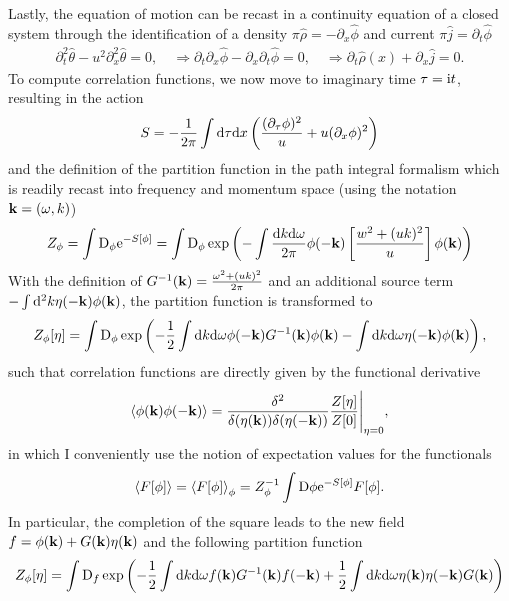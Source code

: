 Lastly, the equation of motion can be recast in a continuity equation of a closed system through the identification of a density $\pi\hat\rho=-\partial_x\hat\phi$ and current $\pi\hat j = \partial_t\hat\phi$
\begin{align}
    \partial_t^2\hat \theta - u^2\partial_x^2\hat \theta = 0,
    \quad
    \Rightarrow
    \partial_t\partial_x\hat \phi - \partial_x\partial_t\hat \phi = 0,
    \quad
    \Rightarrow
    \partial_t\hat \rho(x) + \partial_x \hat j = 0.
\end{align}
To compute correlation functions, we now move to imaginary time $\tau=\mathrm i t$, resulting in the action
\begin{align}
    S = -\frac1{2\pi}\int\mathrm d\tau\mathrm d x\left(  \frac{(\partial_\tau\phi)^2}u + u(\partial_x\phi)^2 \right)
\end{align}
and the definition of the partition function in the path integral formalism which is readily recast into frequency and momentum space (using the notation ${\bf k}=(\omega, k)$)
\begin{align}
    Z_\phi = \int\mathrm D_\phi \mathrm e^{-S[\phi]} = \int\mathrm D_\phi \exp\left( -\int\frac{\mathrm d k\mathrm d\omega}{2\pi}\phi(-{\bf k})\left[ \frac{w^2+(uk)^2}{u} \right]\phi({\bf k}) \right)
\end{align}
With the definition of $G^{-1}({\bf k})=\frac{\omega^2+(uk)^2}{2\pi}$ and an additional source term $-\int\mathrm d^2k\eta(-{\bf k})\phi({\bf k})$, the partition function is transformed to
\begin{align}
    Z_\phi[\eta] = \int\mathrm D_\phi \exp\left( -\frac12\int\mathrm d k\mathrm d\omega\phi(-{\bf k})G^{-1}({\bf k})\phi({\bf k}) -\int\mathrm d k\mathrm d\omega\eta(-{\bf k})\phi({\bf k}) \right),
\end{align}
such that correlation functions are directly given by the functional derivative
\begin{align}
    \braket{\phi({\bf k})\phi(-{\bf k})}=\frac{\delta^2}{\delta(\eta({\bf k}))\delta(\eta(-{\bf k}))}\frac{Z[\eta]}{Z[0]}\Bigg|_{\eta=0},
\end{align}
in which I conveniently use the notion of expectation values for the functionals
\begin{align}
    \braket{F[\phi]} = \braket{F[\phi]}_\phi = Z_\phi^{-1}\int\mathrm D\phi\mathrm e^{-S[\phi]}F[\phi].
\end{align}
In particular, the completion of the square leads to the new field $f=\phi({\bf k})+G({\bf k})\eta({\bf k})$ and the following partition function
\begin{align}
    Z_\phi[\eta] = \int\mathrm D_{f}\exp\left( -\frac12\int\mathrm d k\mathrm d\omega f({\bf k})G^{-1}({\bf k})f(-{\bf k}) + \frac12\int\mathrm d k\mathrm d\omega\eta({\bf k})\eta(-{\bf k})G({\bf k}) \right)
\end{align}
